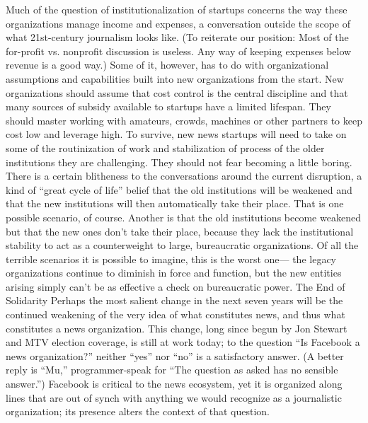 Much of the question of institutionalization of startups concerns the way these
organizations manage income and expenses, a conversation outside the scope
of what 21st-century journalism looks like. (To reiterate our position: Most of
the for-profit vs. nonprofit discussion is useless. Any way of keeping expenses
below revenue is a good way.) Some of it, however, has to do with organizational
assumptions and capabilities built into new organizations from the start.
New organizations should assume that cost control is the central discipline and
that many sources of subsidy available to startups have a limited lifespan. They
should master working with amateurs, crowds, machines or other partners to
keep cost low and leverage high. To survive, new news startups will need to take
on some of the routinization of work and stabilization of process of the older
institutions they are challenging. They should not fear becoming a little boring.
There is a certain blitheness to the conversations around the current disruption, a
kind of ``great cycle of life'' belief that the old institutions will be weakened and
that the new institutions will then automatically take their place.
That is one possible scenario, of course. Another is that the old institutions
become weakened but that the new ones don’t take their place, because they lack
the institutional stability to act as a counterweight to large, bureaucratic organizations.
Of all the terrible scenarios it is possible to imagine, this is the worst one—
the legacy organizations continue to diminish in force and function, but the new
entities arising simply can’t be as effective a check on bureaucratic power.
The End of Solidarity
Perhaps the most salient change in the next seven years will be the continued
weakening of the very idea of what constitutes news, and thus what constitutes
a news organization. This change, long since begun by Jon Stewart and MTV
election coverage, is still at work today; to the question ``Is Facebook a news
organization?'' neither ``yes'' nor ``no'' is a satisfactory answer. (A better reply is
``Mu,'' programmer-speak for ``The question as asked has no sensible answer.'')
Facebook is critical to the news ecosystem, yet it is organized along lines that are
out of synch with anything we would recognize as a journalistic organization; its
presence alters the context of that question.

